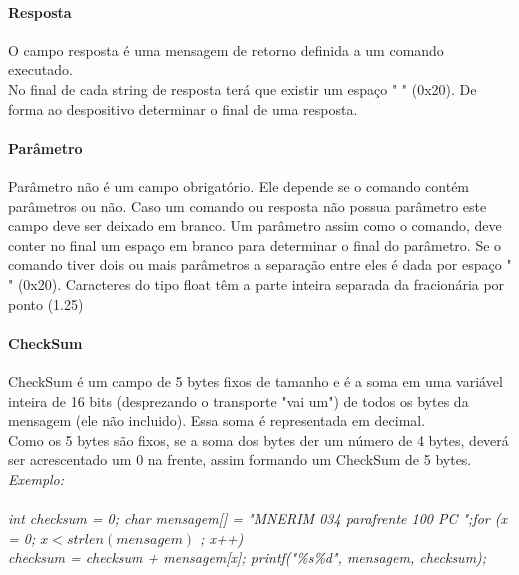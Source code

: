\documentclass[11pt,	 papera4]{article}
\begin{document}
\paragraph{\textbf{Resposta} \newline \newline} 
O campo resposta é uma mensagem de retorno definida a um comando executado. \\
No final de cada string de resposta terá que existir um espaço " " (0x20). De forma ao despositivo determinar o final de uma resposta. \\

\paragraph{\textbf{Parâmetro} \newline \newline } 
Parâmetro não é um campo obrigatório. Ele depende se o comando contém parâmetros ou não.
Caso um comando ou resposta não possua parâmetro este campo deve ser deixado em branco.
Um parâmetro assim como o comando, deve conter no final um espaço em branco para determinar o final do parâmetro. 
Se o comando tiver dois ou mais parâmetros a separação entre eles é dada por espaço " " (0x20). Caracteres do tipo float têm a parte inteira separada da fracionária por ponto (1.25) 

\paragraph{\textbf{CheckSum} \newline \newline } 
CheckSum é um campo de 5 bytes fixos de tamanho e é a soma em uma variável inteira de 16 bits (desprezando o transporte "vai um") de todos os bytes da mensagem (ele não incluido). Essa soma é representada em decimal. \\ Como os 5 bytes são fixos, se a soma dos bytes der um número de 4 bytes, deverá ser acrescentado um 0 na frente, assim formando um CheckSum de 5 bytes.\\

\textsl{ Exemplo: \\\\ int checksum = 0; \newline char mensagem[] = "MNERIM 034 parafrente 100 PC ";\newline for (x = 0; $x
< strlen(mensagem)$
; x++) \\
 \hspace*{1cm}checksum = checksum + mensagem[x]; \newline printf("\%s\%d",  mensagem, checksum); 
} \\
\end{document}
